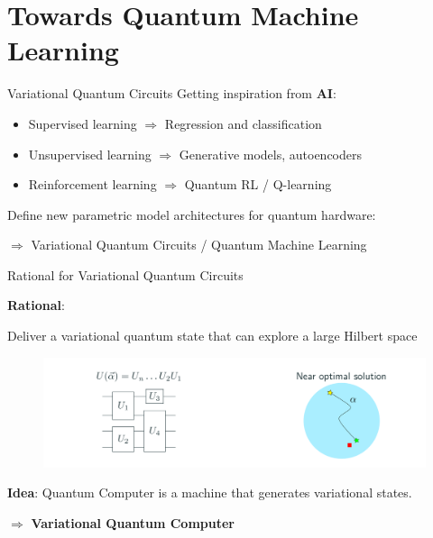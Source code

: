 \documentclass[11p,aspectratio=169]{beamer}
\begin{document}
\section{Towards Quantum Machine Learning}

\begin{frame}{Variational Quantum Circuits}
    Getting inspiration from \textbf{AI}:
    \begin{itemize}
        \item Supervised learning $\Rightarrow$ Regression and classification
        \item Unsupervised learning $\Rightarrow$ Generative models, autoencoders
        \item Reinforcement learning $\Rightarrow$ Quantum RL / Q-learning
    \end{itemize}

    \vspace{2cm}

    Define new parametric model architectures for quantum hardware:


    \centering
    { \color{blue} $\Rightarrow$ Variational Quantum Circuits / Quantum Machine Learning}
\end{frame}

\begin{frame}{Rational for Variational Quantum Circuits}

    \textbf{Rational}:

    Deliver a variational quantum state that can explore a large Hilbert space

    \begin{figure}
        \includegraphics[width=\textwidth]{figures/variational.png}
    \end{figure}
    
    \textbf{Idea}:
    Quantum Computer is a machine that generates variational states.

    $\Rightarrow$ \textbf{Variational Quantum Computer}
\end{frame}
\end{document}
